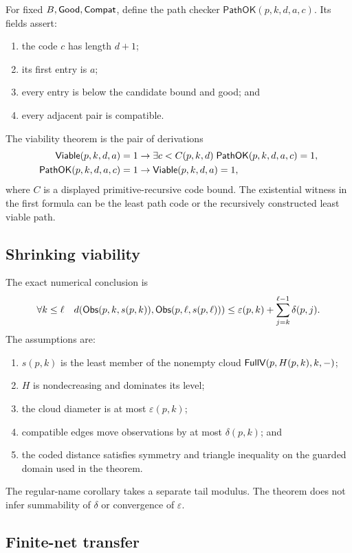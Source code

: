 For fixed \(B,\mathsf{Good},\mathsf{Compat}\), define the path checker
\(\mathsf{PathOK}(p,k,d,a,c)\).  Its fields assert:

\begin{enumerate}
\item the code \(c\) has length \(d+1\);
\item its first entry is \(a\);
\item every entry is below the candidate bound and good; and
\item every adjacent pair is compatible.
\end{enumerate}

The viability theorem is the pair of derivations
\begin{align*}
 \mathsf{Viable}(p,k,d,a)=1
 &\to
 \exists c<C(p,k,d)\;\mathsf{PathOK}(p,k,d,a,c)=1,\\
 \mathsf{PathOK}(p,k,d,a,c)=1
 &\to \mathsf{Viable}(p,k,d,a)=1,
\end{align*}
where \(C\) is a displayed primitive-recursive code bound.  The existential
witness in the first formula can be the least path code or the recursively
constructed least viable path.

\subsection{Shrinking viability}

The exact numerical conclusion is
\[
 \forall k\le\ell\quad
 d(\mathsf{Obs}(p,k,s(p,k)),\mathsf{Obs}(p,\ell,s(p,\ell)))
 \le\varepsilon(p,k)+
       \sum_{j=k}^{\ell-1}\delta(p,j).
\]
The assumptions are:

\begin{enumerate}
\item \(s(p,k)\) is the least member of the nonempty cloud
      \(\mathsf{FullV}(p,H(p,k),k,-)\);
\item \(H\) is nondecreasing and dominates its level;
\item the cloud diameter is at most \(\varepsilon(p,k)\);
\item compatible edges move observations by at most \(\delta(p,k)\); and
\item the coded distance satisfies symmetry and triangle inequality on the
      guarded domain used in the theorem.
\end{enumerate}

The regular-name corollary takes a separate tail modulus.  The theorem does not
infer summability of \(\delta\) or convergence of \(\varepsilon\).

\subsection{Finite-net transfer}

